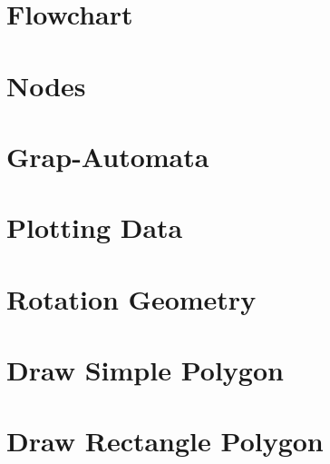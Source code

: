 \section{Flowchart}
\begin{center}
	
\end{center}

\section{Nodes}
\begin{center}
	
\end{center}

\newpage
\section{Grap-Automata}
\begin{figure}[h!]
	\begin{center}
		
	\end{center}
\end{figure}

\newpage
\section{Plotting Data}
\begin{figure}[ht]
	\begin{center}
		
	\end{center}
\end{figure}

\newpage
\section{Rotation Geometry}
\begin{figure}[ht]
	\begin{center}
		
	\end{center}
\end{figure} 

\section{Draw Simple Polygon}
\begin{figure}[ht]
	\begin{center}
		
	\end{center}
\end{figure} 

\section{Draw Rectangle Polygon}
\begin{figure}[ht]
	\begin{center}
		
	\end{center}
\end{figure}